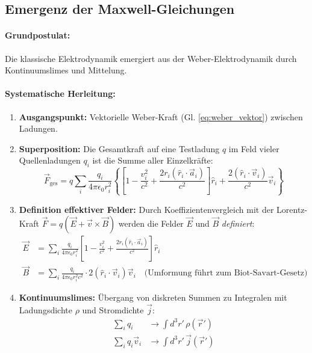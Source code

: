\documentclass[11pt, a4paper]{article}
\begin{document}
\subsection{Emergenz der Maxwell-Gleichungen}
\label{subsec:emergenz_maxwell}

\paragraph{Grundpostulat:} Die klassische Elektrodynamik emergiert aus der Weber-Elektrodynamik durch Kontinuumslimes und Mittelung.

\paragraph{Systematische Herleitung:}
\begin{enumerate}
    \item \textbf{Ausgangspunkt:} Vektorielle Weber-Kraft (Gl. \ref{eq:weber_vektor}) zwischen Ladungen.
    \item \textbf{Superposition:} Die Gesamtkraft auf eine Testladung $q$ im Feld vieler Quellenladungen $q_i$ ist die Summe aller Einzelkräfte:
    \[
    \vec{F}_{\text{ges}} = q \sum_i \frac{q_i}{4\pi\epsilon_0 r_i^2} \left\{ \left[ 1 - \frac{v_i^2}{c^2} + \frac{2r_i (\hat{r}_i \cdot \vec{a}_i)}{c^2} \right] \hat{r}_i + \frac{2 (\hat{r}_i \cdot \vec{v}_i)}{c^2} \vec{v}_i \right\}
    \]
    \item \textbf{Definition effektiver Felder:} Durch Koeffizientenvergleich mit der Lorentz-Kraft $\vec{F} = q(\vec{E} + \vec{v} \times \vec{B})$ werden die Felder $\vec{E}$ und $\vec{B}$ \textit{definiert}:
    \begin{align}
    \vec{E} &= \sum_i \frac{q_i}{4\pi\epsilon_0 r_i^2} \left[ 1 - \frac{v_i^2}{c^2} + \frac{2r_i (\hat{r}_i \cdot \vec{a}_i)}{c^2} \right] \hat{r}_i \\
    \vec{B} &= \sum_i \frac{q_i}{4\pi\epsilon_0 r_i^2 c^2} \cdot 2 (\hat{r}_i \cdot \vec{v}_i) \vec{v}_i \quad \text{(Umformung führt zum Biot-Savart-Gesetz)}
    \end{align}
    \item \textbf{Kontinuumslimes:} Übergang von diskreten Summen zu Integralen mit Ladungsdichte $\rho$ und Stromdichte $\vec{j}$:
    \begin{align}
    \sum_i q_i &\rightarrow \int d^3r' \, \rho(\vec{r}') \\
    \sum_i q_i \vec{v}_i &\rightarrow \int d^3r' \, \vec{j}(\vec{r}')
    \end{align}

\end{enumerate}
\end{document}
